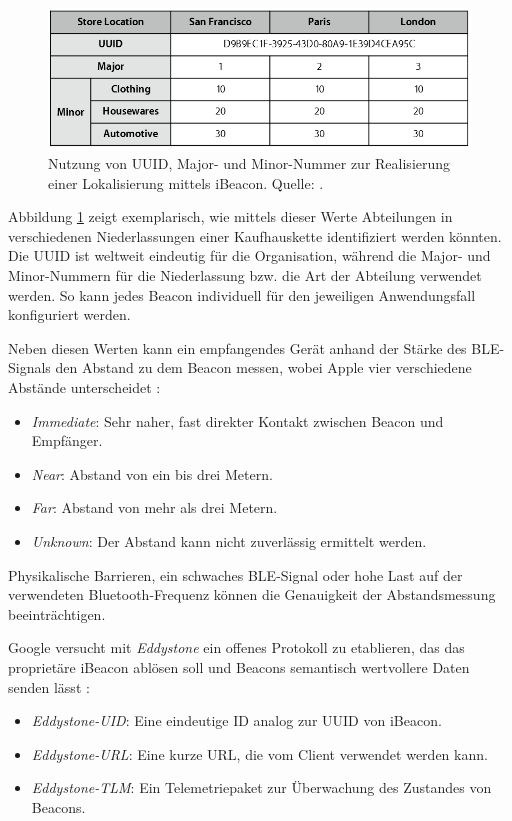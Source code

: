 \begin{figure}[ht]
\centering
\includegraphics[scale=0.65]{bilder/ibeacon.png}
\caption{Nutzung von \acs{UUID}, Major- und Minor-Nummer zur Realisierung einer Lokalisierung mittels iBeacon. Quelle: \citep{iBeacon}.}
\label{fig:ibeacon}
\end{figure}

Abbildung \ref{fig:ibeacon} zeigt exemplarisch, wie mittels dieser Werte Abteilungen in verschiedenen Niederlassungen einer Kaufhauskette identifiziert werden könnten. Die \ac{UUID} ist weltweit eindeutig für die Organisation, während die Major- und Minor-Nummern für die Niederlassung bzw. die Art der Abteilung verwendet werden. So kann jedes Beacon individuell für den jeweiligen Anwendungsfall konfiguriert werden.

Neben diesen Werten kann ein empfangendes Gerät anhand der Stärke des \ac{BLE}-Signals den Abstand zu dem Beacon messen, wobei Apple vier verschiedene Abstände unterscheidet \citep{iBeacon}:
\begin{itemize}
\item \textit{Immediate}: Sehr naher, fast direkter Kontakt zwischen Beacon und Empfänger.
\item \textit{Near}: Abstand von ein bis drei Metern.
\item \textit{Far}: Abstand von mehr als drei Metern.
\item \textit{Unknown}: Der Abstand kann nicht zuverlässig ermittelt werden.
\end{itemize}
Physikalische Barrieren, ein schwaches \ac{BLE}-Signal oder hohe Last auf der verwendeten Bluetooth-Frequenz können die Genauigkeit der Abstandsmessung beeinträchtigen.

Google versucht mit \textit{Eddystone} ein offenes Protokoll zu etablieren, das das proprietäre iBeacon ablösen soll und Beacons semantisch wertvollere Daten senden lässt \citep{Eddystone}:
\begin{itemize}
\item \textit{Eddystone-UID}: Eine eindeutige ID analog zur UUID von iBeacon.
\item \textit{Eddystone-URL}: Eine kurze \acs{URL}, die vom Client verwendet werden kann.
\item \textit{Eddystone-TLM}: Ein Telemetriepaket zur Überwachung des Zustandes von Beacons.
\end{itemize}

